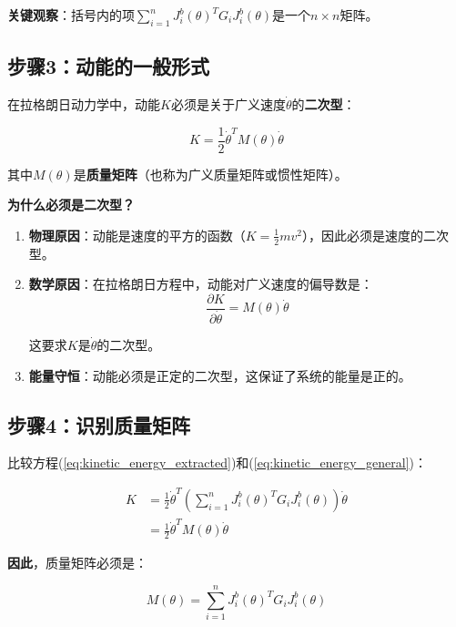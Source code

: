 \documentclass[12pt,a4paper]{article}
\begin{document}
\textbf{关键观察}：括号内的项$\sum_{i=1}^{n} J_i^b(\theta)^T G_i J_i^b(\theta)$是一个$n \times n$矩阵。

\subsection{步骤3：动能的一般形式}

在拉格朗日动力学中，动能$K$必须是关于广义速度$\dot{\theta}$的\textbf{二次型}：

\begin{equation}
K = \frac{1}{2}\dot{\theta}^T M(\theta) \dot{\theta}
\label{eq:kinetic_energy_general}
\end{equation}

其中$M(\theta)$是\textbf{质量矩阵}（也称为广义质量矩阵或惯性矩阵）。

\textbf{为什么必须是二次型？}

\begin{enumerate}
\item \textbf{物理原因}：动能是速度的平方的函数（$K = \frac{1}{2}mv^2$），因此必须是速度的二次型。

\item \textbf{数学原因}：在拉格朗日方程中，动能对广义速度的偏导数是：
\begin{equation}
\frac{\partial K}{\partial \dot{\theta}} = M(\theta) \dot{\theta}
\end{equation}

这要求$K$是$\dot{\theta}$的二次型。

\item \textbf{能量守恒}：动能必须是正定的二次型，这保证了系统的能量是正的。
\end{enumerate}

\subsection{步骤4：识别质量矩阵}

比较方程(\ref{eq:kinetic_energy_extracted})和(\ref{eq:kinetic_energy_general})：

\begin{align}
K &= \frac{1}{2}\dot{\theta}^T \left(\sum_{i=1}^{n} J_i^b(\theta)^T G_i J_i^b(\theta)\right) \dot{\theta} \\
&= \frac{1}{2}\dot{\theta}^T M(\theta) \dot{\theta}
\end{align}

\textbf{因此}，质量矩阵必须是：

\begin{equation}
M(\theta) = \sum_{i=1}^{n} J_i^b(\theta)^T G_i J_i^b(\theta)
\label{eq:mass_matrix_final}
\end{equation}
\end{document}
